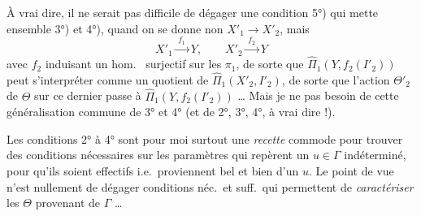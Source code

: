 \documentclass[11pt,a4paper]{article}
\begin{document}
À vrai dire, il ne serait pas difficile de dégager une condition 5°) qui mette ensemble 3°) et 4°), quand on se donne non $X'_1 \to X'_2$, mais
\[
  X'_1 \xrightarrow{\;f_1\;} Y, \qquad X'_2 \xrightarrow{\;f_2\;} Y
\]
avec $f_2$ \struck{\ill{}} induisant un hom.\  surjectif sur les $\pi_1$, de sorte que
$\hat\Pi_1(Y, f_2(I'_2))$ peut s'interpréter comme un quotient de $\hat\Pi_1(X'_2, I'_2)$, de sorte que l'action \struck{\ill{}} $\Theta'_2$ de $\Theta$ sur ce dernier passe à $\hat\Pi_1(Y, f_2(I'_2))$ \ldots
Mais je ne  pas  besoin de cette généralisation commune de 3° et 4° (et  de 2°, 3°, 4°, à vrai dire !).

Les conditions 2° à 4° sont pour moi surtout une \textit{recette} commode pour trouver des conditions nécessaires sur les paramètres  qui repèrent un $u \in \Gamma$ indéterminé, pour qu'ils soient effectifs i.e.\ proviennent bel et bien d'un $u$. Le point de vue  n'est nullement de dégager  conditions néc.\ et suff.\ qui permettent de \textit{caractériser} les $\Theta$ provenant de $\Gamma$ \ldots
\end{document}
